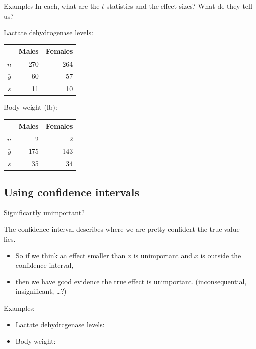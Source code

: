 \begin{frame}{Examples}
    In each, 
    what are the $t$-statistics
    and the effect sizes?
    What do they tell us?

  \vfill

  Lactate dehydrogenase levels:
  \begin{center}
    \begin{tabular}{crr}
       & Males & Females \\
       \hline
       $n$ & 270 & 264 \\
       $\bar y$ & 60 & 57 \\
       $s$ & 11 & 10
     \end{tabular}
  \end{center}
  
  \vfill

  Body weight (lb):
  \begin{center}
    \begin{tabular}{crr}
       & Males & Females \\
       \hline
       $n$ & 2 & 2 \\
       $\bar y$ & 175 & 143 \\
       $s$ & 35 & 34
     \end{tabular}
 \end{center}

\end{frame}


\subsection{Using confidence intervals}

\begin{frame}{Significantly unimportant?}

    The \alert{confidence interval} describes where we are pretty confident the true value lies.

    \begin{itemize}

    \item So if we think an effect smaller than $x$ is \alert{unimportant}
      and $x$ is outside the confidence interval,

    \item then we have good evidence the true effect is unimportant.
      (inconsequential, insignificant, \ldots?)

    \end{itemize}

    \vspace{2em}

    Examples:
    \begin{itemize}
      \item Lactate dehydrogenase levels:
      \item Body weight:
    \end{itemize}

\end{frame}

